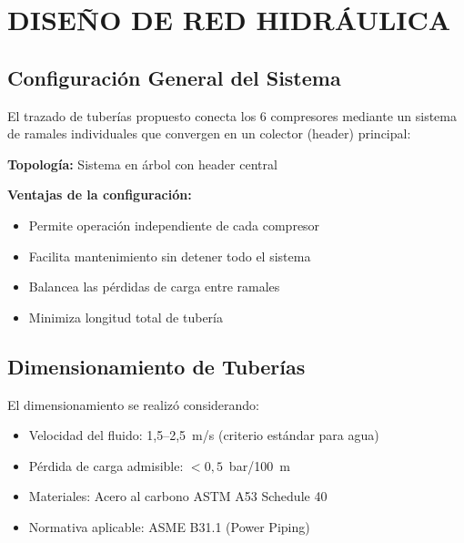 \documentclass[12pt,a4paper]{article}
\begin{document}
\newpage

\section{DISEÑO DE RED HIDRÁULICA}

\subsection{Configuración General del Sistema}

El trazado de tuberías propuesto conecta los 6 compresores mediante un sistema de ramales individuales que convergen en un colector (header) principal:

\textbf{Topología:} Sistema en árbol con header central

\textbf{Ventajas de la configuración:}
\begin{itemize}
    \item Permite operación independiente de cada compresor
    \item Facilita mantenimiento sin detener todo el sistema
    \item Balancea las pérdidas de carga entre ramales
    \item Minimiza longitud total de tubería
\end{itemize}

\subsection{Dimensionamiento de Tuberías}

El dimensionamiento se realizó considerando:
\begin{itemize}
    \item Velocidad del fluido: 1,5--2,5~m/s (criterio estándar para agua)
    \item Pérdida de carga admisible: $< 0{,}5$~bar/100~m
    \item Materiales: Acero al carbono ASTM A53 Schedule 40
    \item Normativa aplicable: ASME B31.1 (Power Piping)
\end{itemize}
\end{document}
